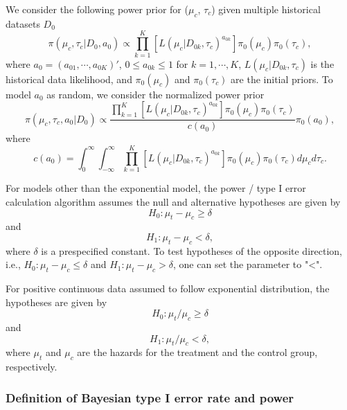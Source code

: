We consider the following power prior for ($\mu_c$, $\tau_c$) given multiple historical datasets $D_0$ $$\pi(\mu_c, \tau_c|D_0,a_0) \propto \prod_{k=1}^K \left[L(\mu_c|D_{0k}, \tau_c)^{a_{0k}}\right]\pi_0(\mu_c)\pi_0(\tau_c),$$ where $a_0 = (a_{01},\cdots,a_{0K})'$, $0\le a_{0k} \le 1$ for $k=1,\cdots,K$, $L(\mu_c|D_{0k}, \tau_c)$ is the historical data likelihood, and $\pi_0(\mu_c)$ and $\pi_0(\tau_c)$ are the initial priors. To model $a_0$ as random, we consider the normalized power prior $$\pi(\mu_c, \tau_c, a_0|D_0) \propto \frac{\prod_{k=1}^K \left[L(\mu_c|D_{0k}, \tau_c)^{a_{0k}}\right]\pi_0(\mu_c)\pi_0(\tau_c)}{c(a_0)}\pi_0(a_0),$$ where $$c(a_0)=\int_0^\infty\int_{-\infty}^\infty \prod_{k=1}^K [L(\mu_c|D_{0k}, \tau_c)^{a_{0k}}]\pi_0(\mu_c)\pi_0(\tau_c)d\mu_cd\tau_c.$$

For models other than the exponential model, the power / type I error calculation algorithm assumes the null and alternative hypotheses are given by $$H_0: \mu_t - \mu_c \ge \delta$$ and $$H_1: \mu_t - \mu_c < \delta,$$ where $\delta$ is a prespecified constant. To test hypotheses of the opposite direction, i.e., $H_0: \mu_t - \mu_c \le \delta$ and $H_1: \mu_t - \mu_c > \delta$, one can set the parameter  to "<".

For positive continuous data assumed to follow exponential distribution, the hypotheses are given by
$$H_0: \mu_t/\mu_c \ge \delta$$ and $$H_1: \mu_t/\mu_c < \delta,$$ where $\mu_t$ and $\mu_c$ are the hazards for the treatment and the control group, respectively.


\subsubsection*{Definition of Bayesian type I error rate and power}

